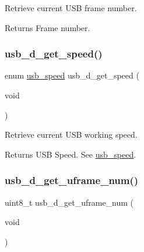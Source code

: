 Retrieve current U\+SB frame number. 

\begin{DoxyReturn}{Returns}
Frame number. 
\end{DoxyReturn}
\mbox{\label{group__doc__driver__hal__usb__device_gaf62023a87e77430dab4553fe213733c0}} 
\subsubsection{\texorpdfstring{usb\+\_\+d\+\_\+get\+\_\+speed()}{usb\_d\_get\_speed()}}
{\footnotesize\ttfamily enum \hyperlink{hpl__usb_8h_aa8869b6740b8c54598b0c8aa8bf4d340}{usb\+\_\+speed} usb\+\_\+d\+\_\+get\+\_\+speed (\begin{DoxyParamCaption}\item[{void}]{ }\end{DoxyParamCaption})}



Retrieve current U\+SB working speed. 

\begin{DoxyReturn}{Returns}
U\+SB Speed. See \hyperlink{hpl__usb_8h_aa8869b6740b8c54598b0c8aa8bf4d340}{usb\+\_\+speed}. 
\end{DoxyReturn}
\mbox{\label{group__doc__driver__hal__usb__device_ga99f3ce0a0dc651174ec3785eb128a062}} 
\subsubsection{\texorpdfstring{usb\+\_\+d\+\_\+get\+\_\+uframe\+\_\+num()}{usb\_d\_get\_uframe\_num()}}
{\footnotesize\ttfamily uint8\+\_\+t usb\+\_\+d\+\_\+get\+\_\+uframe\+\_\+num (\begin{DoxyParamCaption}\item[{void}]{ }\end{DoxyParamCaption})}



